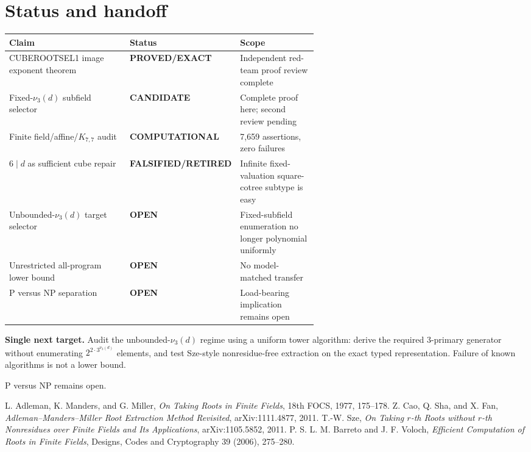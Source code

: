 \documentclass[11pt]{article}
\newcommand{\EXACT}{\textbf{PROVED/EXACT}}
\newcommand{\COMP}{\textbf{COMPUTATIONAL}}
\newcommand{\CAND}{\textbf{CANDIDATE}}
\newcommand{\OPEN}{\textbf{OPEN}}
\newcommand{\RET}{\textbf{FALSIFIED/RETIRED}}
\begin{document}
\section{Status and handoff}
\begin{center}
\begin{tabularx}{0.98\linewidth}{p{0.39\linewidth}p{0.20\linewidth}X}
\toprule
Claim & Status & Scope \\
\midrule
CUBEROOTSEL1 image exponent theorem & \EXACT & Independent red-team proof review complete \\
Fixed-$\nu_3(d)$ subfield selector & \CAND & Complete proof here; second review pending \\
Finite field/affine/$K_{7,7}$ audit & \COMP & 7,659 assertions, zero failures \\
$6\mid d$ as sufficient cube repair & \RET & Infinite fixed-valuation square-cotree subtype is easy \\
Unbounded-$\nu_3(d)$ target selector & \OPEN & Fixed-subfield enumeration no longer polynomial uniformly \\
Unrestricted all-program lower bound & \OPEN & No model-matched transfer \\
P versus NP separation & \OPEN & Load-bearing implication remains open \\
\bottomrule
\end{tabularx}
\end{center}

\textbf{Single next target.}  Audit the unbounded-$\nu_3(d)$ regime using a
uniform tower algorithm: derive the required $3$-primary generator without
enumerating $2^{2\cdot3^{\nu_3(d)}}$ elements, and test Sze-style
nonresidue-free extraction on the exact typed representation.  Failure of
known algorithms is not a lower bound.

\bigskip
\noindent P versus NP remains open.

\begin{thebibliography}{9}
L. Adleman, K. Manders, and G. Miller,
\emph{On Taking Roots in Finite Fields}, 18th FOCS, 1977, 175--178.
Z. Cao, Q. Sha, and X. Fan,
\emph{Adleman--Manders--Miller Root Extraction Method Revisited},
arXiv:1111.4877, 2011.
T.-W. Sze,
\emph{On Taking $r$-th Roots without $r$-th Nonresidues over Finite Fields
and Its Applications}, arXiv:1105.5852, 2011.
P. S. L. M. Barreto and J. F. Voloch,
\emph{Efficient Computation of Roots in Finite Fields},
Designs, Codes and Cryptography 39 (2006), 275--280.
\end{thebibliography}
\end{document}
